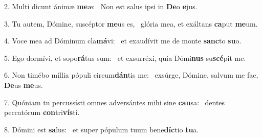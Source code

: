2. Multi dicunt ánimæ \textbf{me}æ: \ast\  Non est salus ipsi in \textbf{De}o \textbf{e}jus.\

3. Tu autem, Dómine, suscéptor \textbf{me}us es, \ast\  glória mea, et exáltans \textbf{ca}put \textbf{me}um.\

4. Voce mea ad Dóminum cla\textbf{má}vi: \ast\  et exaudívit me de monte \textbf{sanc}to \textbf{su}o.\

5. Ego dormívi, et sopo\textbf{rá}tus sum: \ast\  et exsurréxi, quia Dómi\textbf{nus} su\textbf{scé}pit me.\

6. Non timébo míllia pópuli circum\textbf{dán}tis me: \ast\  exsúrge, Dómine, salvum me fac, \textbf{De}us \textbf{me}us.\

7. Quóniam tu percussísti omnes adversántes mihi sine \textbf{cau}sa: \ast\  dentes peccatórum \textbf{con}tri\textbf{vís}ti.\

8. Dómini est \textbf{sa}lus: \ast\  et super pópulum tuum bene\textbf{díc}tio \textbf{tu}a.\

